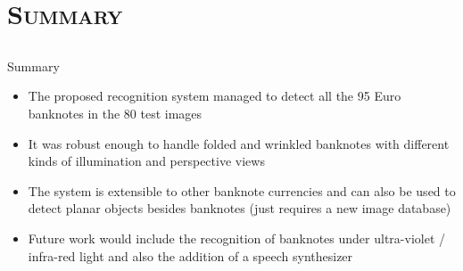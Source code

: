 \section{\scshape Summary}\label{sec:summary}

\subsection*{}
\begin{frame}{Summary}
	\begin{itemize}
		\item The proposed recognition system managed to detect all the 95 Euro banknotes in the 80 test images
		\item It was robust enough to handle folded and wrinkled banknotes with different kinds of illumination and perspective views
		\item The system is extensible to other banknote currencies and can also be used to detect planar objects besides banknotes (just requires a new image database)
		\item Future work would include the recognition of banknotes under ultra-violet / infra-red light and also the addition of a speech synthesizer
	\end{itemize}
\end{frame}
